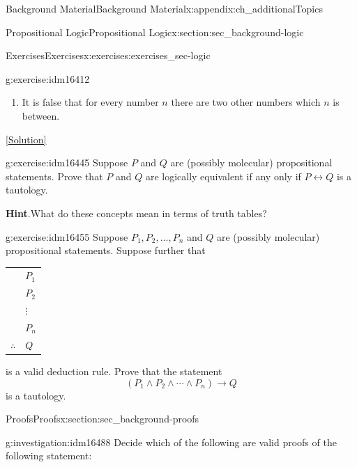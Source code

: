\documentclass[oneside,10pt,]{book}
\numberwithin{equation}{chapter}
\newcommand{\hrulethin}  {\noalign{\hrule height 0.04em}}
\def\iff{\leftrightarrow}
\def\imp{\rightarrow}
\begin{document}
\begin{appendixptx}{Background Material}{}{Background Material}{}{}{x:appendix:ch_additionalTopics}
\begin{sectionptx}{Propositional Logic}{}{Propositional Logic}{}{}{x:section:sec_background-logic}
\begin{exercises-subsection}{Exercises}{}{Exercises}{}{}{x:exercises:exercises_sec-logic}
\begin{divisionexercise}{14}{}{}{g:exercise:idm16412}
\begin{enumerate}[label=(\alph*)]
\item{}It is false that for every number \(n\) there are two other numbers which \(n\) is between.%
\end{enumerate}
%
\space\hspace*{0pt}\hfill{\tiny\hyperlink{g:solution:idm16431-main}{[Solution]}}\end{divisionexercise}%
\begin{divisionexercise}{15}{}{}{g:exercise:idm16445}%
Suppose \(P\) and \(Q\) are (possibly molecular) propositional statements.  Prove that \(P\) and \(Q\) are logically equivalent if any only if \(P \iff Q\) is a tautology.%
\par\smallskip%
\noindent\textbf{Hint}.\hypertarget{g:hint:idm16453}{}\quad{}What do these concepts mean in terms of truth tables?%
\end{divisionexercise}%
\begin{divisionexercise}{16}{}{}{g:exercise:idm16455}%
Suppose \(P_1, P_2, \ldots, P_n\) and \(Q\) are (possibly molecular) propositional statements.  Suppose further that%
\begin{sidebyside}{1}{0}{0}{0}%
\begin{sbspanel}{1}%
{\centering%
\begin{tabular}{ll}
&\(P_1\)\tabularnewline[0pt]
&\(P_2\)\tabularnewline[0pt]
&\(\vdots\)\tabularnewline[0pt]
&\(P_n\)\tabularnewline\hrulethin
\(\therefore\)&\(Q\)
\end{tabular}
\par}
\end{sbspanel}%
\end{sidebyside}%
\par
is a valid deduction rule.  Prove that the statement%
\begin{equation*}
(P_1 \wedge P_2 \wedge \cdots \wedge P_n) \imp Q
\end{equation*}
is a tautology.%
\end{divisionexercise}%
\end{exercises-subsection}
\end{sectionptx}
%
%
\typeout{************************************************}
\typeout{************************************************}
%
\begin{sectionptx}{Proofs}{}{Proofs}{}{}{x:section:sec_background-proofs}
\begin{introduction}{}%
\begin{investigation}{}{g:investigation:idm16488}%
Decide which of the following are valid proofs of the following statement:%

\end{investigation}
\end{introduction}
\end{sectionptx}
\end{appendixptx}
\end{document}
